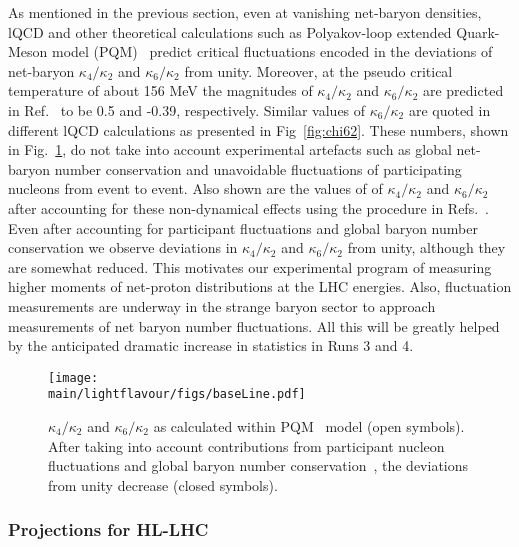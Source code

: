 As mentioned in the previous section, even at vanishing net-baryon densities, lQCD and other theoretical calculations such as Polyakov-loop extended Quark- Meson model (PQM)~\cite{Almasi:2017bhq} predict critical fluctuations encoded in the deviations of net-baryon $\kappa_{4}/\kappa_{2}$ and $\kappa_{6}/\kappa_{2}$ from unity. Moreover, at the pseudo critical temperature of about 156 MeV the magnitudes of $\kappa_{4}/\kappa_{2}$ and $\kappa_{6}/\kappa_{2}$  are predicted in Ref.~\cite{Almasi:2017bhq} to be 0.5 and -0.39, respectively. Similar values of $\kappa_{6}/\kappa_{2}$ are quoted in different lQCD calculations as presented in Fig~\ref{fig:chi62}.  These numbers, shown in  Fig.~\ref{netpALICE_STAR}, do not take into account experimental artefacts such as global net-baryon number conservation and unavoidable fluctuations of participating nucleons from event to event. Also shown are the values of of $\kappa_{4}/\kappa_{2}$ and $\kappa_{6}/\kappa_{2}$ after accounting for these non-dynamical effects using the procedure in Refs.~\cite{Braun-Munzinger:2016yjz, Braun-Munzinger:2018yru}. Even after accounting for participant fluctuations and global baryon number conservation we observe deviations in $\kappa_{4}/\kappa_{2}$ and $\kappa_{6}/\kappa_{2}$ from unity, although they are somewhat reduced.   This motivates our experimental program  of measuring higher moments of net-proton distributions at the LHC energies. Also, fluctuation measurements  are underway in the strange baryon sector to approach measurements of net baryon number fluctuations. All this will be greatly helped by the anticipated dramatic increase in statistics in Runs 3 and 4.

\begin{figure}[ht]
\begin{center}
\texttt{[image: \\main/lightflavour/figs/baseLine.pdf]}
\end{center}
\caption{$\kappa_{4}/\kappa_{2}$ and $\kappa_{6}/\kappa_{2}$  as calculated within PQM~\cite{Almasi:2017bhq} model (open symbols).  After taking into account contributions from participant nucleon fluctuations and global baryon number conservation~\cite{Braun-Munzinger:2016yjz, Braun-Munzinger:2018yru}, the deviations from unity decrease (closed symbols).} 
\label{netpALICE_STAR}
\end{figure}

\subsubsection{Projections for HL-LHC}

